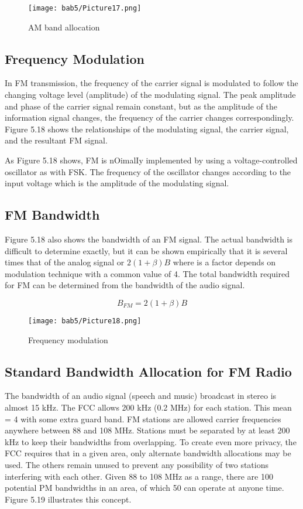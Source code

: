 \begin{figure}
  \centering
  \texttt{[image: bab5/Picture17.png]}
  \caption{AM band allocation}
  \label{fig5:17}
\end{figure}

\subsection{Frequency Modulation}
In FM transmission, the frequency of the carrier signal is modulated to follow the changing voltage level (amplitude) of the modulating signal. The peak amplitude and phase of the carrier signal remain constant, but as the amplitude of the information signal changes, the frequency of the carrier changes correspondingly. Figure 5.18 shows the relationships of the modulating signal, the carrier signal, and the resultant FM signal. 

As Figure 5.18 shows, FM is nOimalIy implemented by using a voltage-controlled oscillator as with FSK. The frequency of the oscillator changes according to the input voltage which is the amplitude of the modulating signal.

\subsection*{FM Bandwidth}
Figure 5.18 also shows the bandwidth of an FM signal. The actual bandwidth is difficult to determine exactly, but it can be shown empirically that it is several times that of the analog signal or $2(1 + \beta)B$ where is a factor depends on modulation technique with a common value of 4. The total bandwidth required for FM can be determined from the bandwidth of the audio signal.

\begin{equation}
  B_{FM} =2(1 + \beta)B
\end{equation}

\begin{figure}
  \centering
  \texttt{[image: bab5/Picture18.png]}
  \caption{Frequency modulation}
  \label{fig5:18}
\end{figure}

\subsection*{Standard Bandwidth Allocation for FM Radio}
The bandwidth of an audio signal (speech and music) broadcast in stereo is almost 15 kHz. The FCC allows 200 kHz (0.2 MHz) for each station. This mean = 4 with some extra guard band. FM stations are allowed carrier frequencies anywhere between 88 and 108 MHz. Stations must be separated by at least 200 kHz to keep their bandwidths from overlapping. To create even more privacy, the FCC requires that in a given area, only alternate bandwidth allocations may be used. The others remain unused to prevent any possibility of two stations interfering with each other. Given 88 to 108 MHz as a range, there are 100 potential PM bandwidths in an area, of which 50 can operate at anyone time. Figure 5.19 illustrates this concept.

